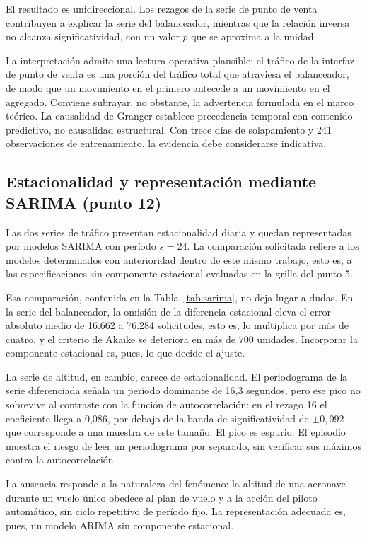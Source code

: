 El resultado es unidireccional. Los rezagos de la serie de punto de venta contribuyen a
explicar la serie del balanceador, mientras que la relación inversa no alcanza
significatividad, con un valor $p$ que se aproxima a la unidad.

La interpretación admite una lectura operativa plausible: el tráfico de la interfaz de punto de venta es una porción del tráfico total que atraviesa el balanceador, de modo que un
movimiento en el primero antecede a un movimiento en el agregado. Conviene subrayar, no
obstante, la advertencia formulada en el marco teórico. La causalidad de Granger establece
precedencia temporal con contenido predictivo, no causalidad estructural. Con trece días de
solapamiento y 241 observaciones de entrenamiento, la evidencia debe considerarse indicativa.

\subsection{Estacionalidad y representación mediante SARIMA (punto 12)}

Las dos series de tráfico presentan estacionalidad diaria y quedan representadas por modelos
SARIMA con período $s = 24$. La comparación solicitada refiere a los modelos determinados con
anterioridad dentro de este mismo trabajo, esto es, a las especificaciones sin componente
estacional evaluadas en la grilla del punto 5.

Esa comparación, contenida en la Tabla~\ref{tab:sarima}, no deja lugar a dudas. En la serie del
balanceador, la omisión de la diferencia estacional eleva el error absoluto medio de 16.662 a
76.284 solicitudes, esto es, lo multiplica por más de cuatro, y el criterio de Akaike se
deteriora en más de 700 unidades. Incorporar la componente estacional es, pues, lo que decide el ajuste.

La serie de altitud, en cambio, carece de estacionalidad. El periodograma de la serie diferenciada señala un período dominante de 16,3 segundos, pero ese pico no sobrevive al contraste con la función de autocorrelación: en el rezago 16 el coeficiente llega a 0,086, por debajo de la banda de significatividad de $\pm 0{,}092$ que corresponde a una muestra de este tamaño. El pico es espurio. El episodio muestra el riesgo de leer un periodograma por separado, sin verificar sus máximos contra la autocorrelación.

La ausencia responde a la naturaleza del fenómeno: la altitud de una aeronave durante un vuelo
único obedece al plan de vuelo y a la acción del piloto automático, sin ciclo repetitivo de
período fijo. La representación adecuada es, pues, un modelo ARIMA sin componente estacional.
